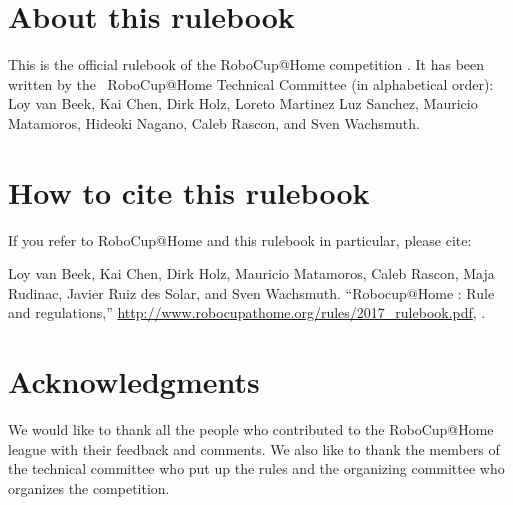 


\section*{About this rulebook}
This is the official rulebook of the RoboCup@Home competition \YEAR.
It has been written by the \YEAR ~RoboCup@Home Technical Committee (in alphabetical order): 
Loy van Beek, 
Kai Chen, 
Dirk Holz,  
Loreto Martinez Luz Sanchez, 
Mauricio Matamoros, 
Hideoki Nagano,
Caleb Rascon, and 
Sven Wachsmuth.

\section*{How to cite this rulebook}
If you refer to RoboCup@Home and this rulebook in particular, please cite:

Loy van Beek, Kai Chen, Dirk Holz, Mauricio Matamoros, Caleb Rascon, Maja Rudinac, Javier Ruiz des Solar, and Sven Wachsmuth. 
``Robocup@Home \YEAR: Rule and regulations,'' 
\url{http://www.robocupathome.org/rules/2017_rulebook.pdf}, \YEAR.



\section*{Acknowledgments}
\label{sec:acknowledgments}


We would like to thank all the people who contributed to the RoboCup@Home league 
with their feedback and comments. 
We also like to thank the members of the technical committee who put up the rules
and the organizing committee who organizes the competition.  

